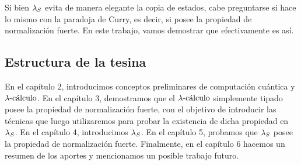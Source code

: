 Si bien \( \lambdas \) evita de manera elegante la copia de estados, cabe preguntarse si hace lo mismo con la paradoja de Curry, es decir, si posee la propiedad de normalización fuerte. En este trabajo, vamos demostrar que efectivamente es así.

\subsection*{Estructura de la tesina}
En el capítulo 2, introducimos conceptos preliminares de computación cuántica y \( \lambdacalculus \). En el capítulo 3, demostramos que el \( \lambdacalculus \) simplemente tipado posee la propiedad de normalización fuerte, con el objetivo de introducir las técnicas que luego utilizaremos para probar la existencia de dicha propiedad en \( \lambdas \). En el capítulo 4, introducimos \( \lambdas \). En el capítulo 5, probamos que \( \lambdas \) posee la propiedad de normalización fuerte. Finalmente, en el capítulo 6 hacemos un resumen de los aportes y mencionamos un posible trabajo futuro.

